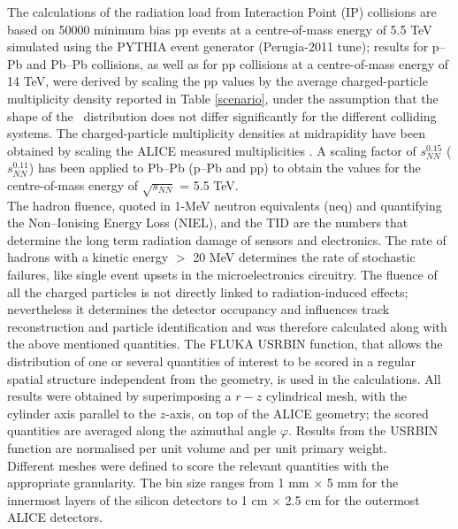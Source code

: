 The calculations of the radiation load from Interaction Point (IP) collisions are based on 50000 minimum bias pp events at a centre-of-mass energy of 5.5 TeV simulated using the PYTHIA \cite{pythia} event generator (Perugia-2011 tune);  results for p--Pb and Pb--Pb collisions, as well as for pp collisions at a centre-of-mass energy of 14 TeV, were derived by scaling the pp values by the average charged-particle multiplicity density reported in Table \ref{scenario}, under the assumption that the shape of the \dndeta \ distribution does not differ significantly for the different colliding systems. The charged-particle multiplicity densities at midrapidity have been obtained by scaling the ALICE measured multiplicities \cite{pp, pPb, PbPb, PbPbbis}. A scaling factor of $s^{0.15}_{NN}$ ($s^{0.11}_{NN}$) has been applied to Pb--Pb (p--Pb and pp) to obtain the values for the centre-of-mass energy of $\sqrt{s_{NN}}$ = 5.5 TeV.\\
The hadron fluence, quoted in 1-MeV neutron equivalents (neq) and quantifying the Non--Ionising Energy Loss (NIEL), and the TID are the numbers that determine the long term radiation damage of sensors and electronics.
The rate of hadrons with a kinetic energy $>$ 20 MeV determines the rate of stochastic failures, like single event upsets in the microelectronics circuitry. The fluence of all the charged particles is not directly linked to radiation-induced effects; nevertheless it determines the detector occupancy and influences track reconstruction and particle identification and was therefore calculated along with the above mentioned quantities.
The FLUKA USRBIN function, that allows the distribution of one or several quantities of interest to be scored in a regular spatial structure independent from the geometry, is used in the calculations. All results were obtained by superimposing a $r-z$ cylindrical mesh, with the cylinder axis parallel to the $z$-axis, on top of the ALICE geometry; the scored quantities are averaged along the azimuthal angle $\varphi$. Results from the USRBIN function are normalised per unit volume and per unit primary weight.\\
Different meshes were defined to score the relevant quantities with the appropriate granularity. The bin size ranges from 1 mm $\times$ 5 mm for the innermost layers of the silicon detectors to 1 cm $\times$ 2.5 cm for the outermost ALICE detectors.

